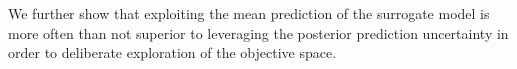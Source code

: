 \documentclass[conference]{IEEEtran}
\begin{document}
We further show that exploiting the mean prediction of the surrogate model is more often than not superior to leveraging the posterior prediction uncertainty in order to deliberate exploration of the objective space. 






\end{document}
